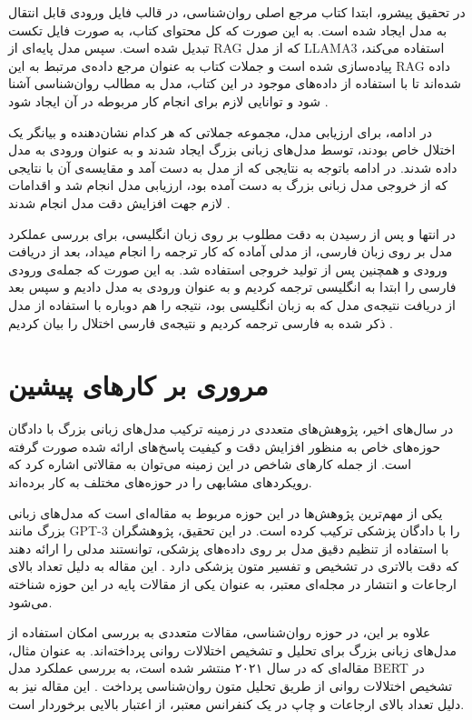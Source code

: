 \documentclass{CCI2020}
\begin{document}
در تحقیق پیشرو، ابتدا کتاب مرجع اصلی روان‌شناسی، در قالب فایل ورودی قابل انتقال به مدل ایجاد شده است. به این صورت که کل محتوای کتاب، به صورت فایل تکست تبدیل شده است. سپس مدل پایه‌ای از RAG که از مدل LLAMA3 استفاده می‌کند، پیاده‌سازی شده است و جملات کتاب به عنوان مرجع داده‌ی مرتبط به این RAG داده شده‌اند تا با استفاده از داده‌های موجود در این کتاب، مدل به مطالب روان‌شناسی آشنا شود و توانایی لازم برای انجام کار مربوطه در آن ایجاد شود \cite{llama3_rag}.

در ادامه، برای ارزیابی مدل، مجموعه جملاتی که هر کدام نشان‌دهنده و بیانگر یک اختلال خاص بودند، توسط مدل‌های زبانی بزرگ ایجاد شدند و به عنوان ورودی به مدل داده شدند. در ادامه باتوجه به نتایجی که از مدل به دست آمد و مقایسه‌ی آن با نتایجی که از خروجی مدل زبانی بزرگ به دست آمده بود، ارزیابی مدل انجام شد و اقدامات لازم جهت افزایش دقت مدل انجام شدند \cite{evaluation_methods}.

در انتها و پس از رسیدن به دقت مطلوب بر روی زبان انگلیسی، برای بررسی عملکرد مدل بر روی زبان فارسی، از مدلی آماده که کار ترجمه را انجام میداد، بعد از دریافت ورودی و همچنین  پس از تولید خروجی استفاده شد. به این صورت که جمله‌ی ورودی فارسی را ابتدا به انگلیسی ترجمه کردیم و به عنوان ورودی به مدل دادیم و سپس بعد از دریافت نتیجه‌ی مدل که به زبان انگلیسی بود، نتیجه را هم دوباره با استفاده از مدل ذکر شده به فارسی ترجمه کردیم و نتیجه‌ی فارسی اختلال را بیان کردیم \cite{translation_methods}.





\section{مروری بر کارهای پیشین}

در سال‌های اخیر، پژوهش‌های متعددی در زمینه ترکیب مدل‌های زبانی بزرگ با دادگان حوزه‌های خاص به منظور افزایش دقت و کیفیت پاسخ‌های ارائه شده صورت گرفته است. از جمله کارهای شاخص در این زمینه می‌توان به مقالاتی اشاره کرد که رویکردهای مشابهی را در حوزه‌های مختلف به کار برده‌اند.

یکی از مهم‌ترین پژوهش‌ها در این حوزه مربوط به مقاله‌ای است که مدل‌های زبانی بزرگ مانند GPT-3 را با دادگان پزشکی ترکیب کرده است. در این تحقیق، پژوهشگران با استفاده از تنظیم دقیق مدل بر روی داده‌های پزشکی، توانستند مدلی را ارائه دهند که دقت بالاتری در تشخیص و تفسیر متون پزشکی دارد \cite{Brown2020Language}. این مقاله به دلیل تعداد بالای ارجاعات و انتشار در مجله‌ای معتبر، به عنوان یکی از مقالات پایه در این حوزه شناخته می‌شود.

علاوه بر این، در حوزه روان‌شناسی، مقالات متعددی به بررسی امکان استفاده از مدل‌های زبانی بزرگ برای تحلیل و تشخیص اختلالات روانی پرداخته‌اند. به عنوان مثال، مقاله‌ای که در سال ۲۰۲۱ منتشر شده است، به بررسی عملکرد مدل BERT در تشخیص اختلالات روانی از طریق تحلیل متون روان‌شناسی پرداخت \cite{Shen2021Neural}. این مقاله نیز به دلیل تعداد بالای ارجاعات و چاپ در یک کنفرانس معتبر، از اعتبار بالایی برخوردار است.
\end{document}
